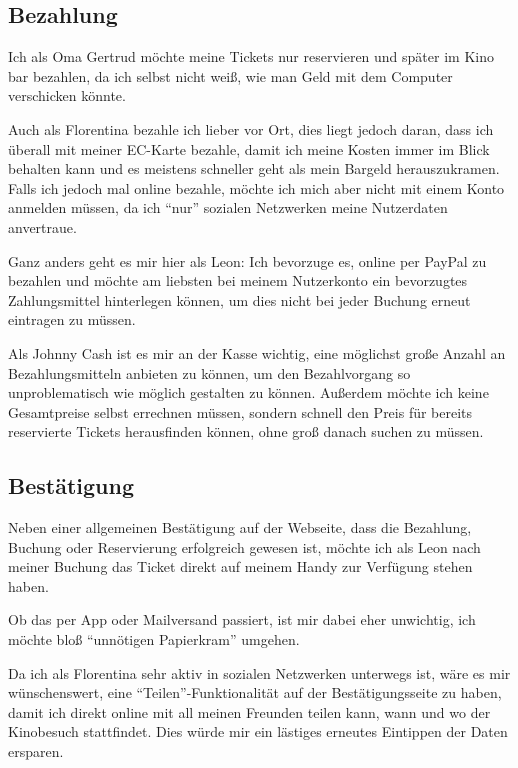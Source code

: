 \subsection{Bezahlung}
Ich als Oma Gertrud möchte meine Tickets nur reservieren und später im Kino bar bezahlen, da ich selbst nicht weiß, wie man Geld mit dem Computer verschicken könnte.

Auch als Florentina bezahle ich lieber vor Ort, dies liegt jedoch daran, dass ich überall mit meiner EC-Karte bezahle, damit ich meine Kosten immer im Blick behalten kann und es meistens schneller geht als mein Bargeld herauszukramen.
Falls ich jedoch mal online bezahle, möchte ich mich aber nicht mit einem Konto anmelden müssen, da ich \enquote{nur} sozialen Netzwerken meine Nutzerdaten anvertraue.

Ganz anders geht es mir hier als Leon: Ich bevorzuge es, online per PayPal zu bezahlen und möchte am liebsten bei meinem Nutzerkonto ein bevorzugtes Zahlungsmittel hinterlegen können, um dies nicht bei jeder Buchung erneut eintragen zu müssen.

Als Johnny Cash ist es mir an der Kasse wichtig, eine möglichst große Anzahl an Bezahlungsmitteln anbieten zu können, um den Bezahlvorgang so unproblematisch wie möglich gestalten zu können.
Außerdem möchte ich keine Gesamtpreise selbst errechnen müssen, sondern schnell den Preis für bereits reservierte Tickets herausfinden können, ohne groß danach suchen zu müssen.

\subsection{Bestätigung}
Neben einer allgemeinen Bestätigung auf der Webseite, dass die Bezahlung, Buchung oder Reservierung erfolgreich gewesen ist, möchte ich als Leon nach meiner Buchung das Ticket direkt auf meinem Handy zur Verfügung stehen haben.

Ob das per App oder Mailversand passiert, ist mir dabei eher unwichtig, ich möchte bloß \enquote{unnötigen Papierkram} umgehen.

Da ich als Florentina sehr aktiv in sozialen Netzwerken unterwegs ist, wäre es mir wünschenswert, eine \enquote{Teilen}-Funktionalität auf der Bestätigungsseite zu haben, damit ich direkt online mit all meinen Freunden teilen kann, wann und wo der Kinobesuch stattfindet.
Dies würde mir ein lästiges erneutes Eintippen der Daten ersparen.

